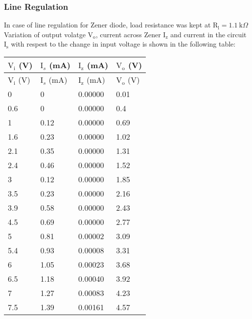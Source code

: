 \documentclass[12pt]{article}
\begin{document}
\subsubsection{Line Regulation}

In case of line regulation for Zener diode, load resistance was kept at $\mathrm{R_l} = 1.1 \ \text{k}\Omega$
Variation of output volatge $\mathrm{V_o}$, current across Zener $\mathrm{I_z}$ and current in the circuit $\mathrm{I_s}$ with respest to the change in input voltage is shown in the following table:
\begin{longtable}{|l|l|l|l|}
        \hline
        $\mathrm{V_i}$ (V) & $\text{I}_{s}$ (mA) & $\text{I}_\text{z}$ (mA) & $\text{V}_\text{o}$ (V) \\ \hline \hline
        \endfirsthead
        \hline
        $\mathrm{V_i}$ (V) & $\text{I}_{s}$ (mA) & $\text{I}_\text{z}$ (mA) & $\text{V}_\text{o}$ (V) \\ \hline \hline
        \endhead
        0      & 0       & 0.00000       & 0.01    \\ \hline
        0.6    & 0       & 0.00000       & 0.4     \\ \hline
        1      & 0.12    & 0.00000      & 0.69    \\ \hline
        1.6    & 0.23    & 0.00000       & 1.02    \\ \hline
        2.1    & 0.35    & 0.00000      & 1.31    \\ \hline
        2.4    & 0.46    & 0.00000       & 1.52    \\ \hline
        3      & 0.12    & 0.00000       & 1.85    \\ \hline
        3.5    & 0.23    & 0.00000       & 2.16    \\ \hline
        3.9    & 0.58    & 0.00000      & 2.43    \\ \hline
        4.5    & 0.69    & 0.00000       & 2.77    \\ \hline
        5      & 0.81    & 0.00002       & 3.09    \\ \hline
        5.4    & 0.93    & 0.00008       & 3.31    \\ \hline
        6      & 1.05    & 0.00023       & 3.68    \\ \hline
        6.5    & 1.18    & 0.00040       & 3.92    \\ \hline
        7      & 1.27    & 0.00083       & 4.23    \\ \hline
        7.5    & 1.39    & 0.00161       & 4.57    \\ \hline

\end{longtable}
\end{document}
